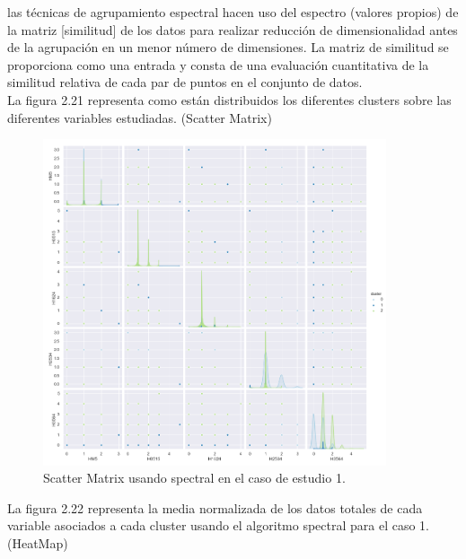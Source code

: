 	las técnicas de agrupamiento espectral hacen uso del espectro (valores propios)
	de la matriz [similitud] de los datos para realizar reducción de dimensionalidad 
	antes de la agrupación en un menor número de dimensiones. La matriz de similitud se 
	proporciona como una entrada y consta de una evaluación cuantitativa de la similitud 
	relativa de cada par de puntos en el conjunto de datos. \cite{cite5} \\


	La figura 2.21 representa como están distribuidos los diferentes clusters sobre las diferentes variables estudiadas. (Scatter Matrix)\\

	\begin{figure}[htb]
		\centering
		\includegraphics[width=0.9\textwidth]{./imagenes/caso1/scatterMatrix_caso1_spectral}
		\caption{Scatter Matrix usando spectral en el caso de estudio 1.} \label{fig:1}
	\end{figure}

	La figura 2.22 representa la media normalizada de los datos totales de cada variable asociados
	a cada cluster usando el algoritmo spectral para el caso 1. (HeatMap) \\

